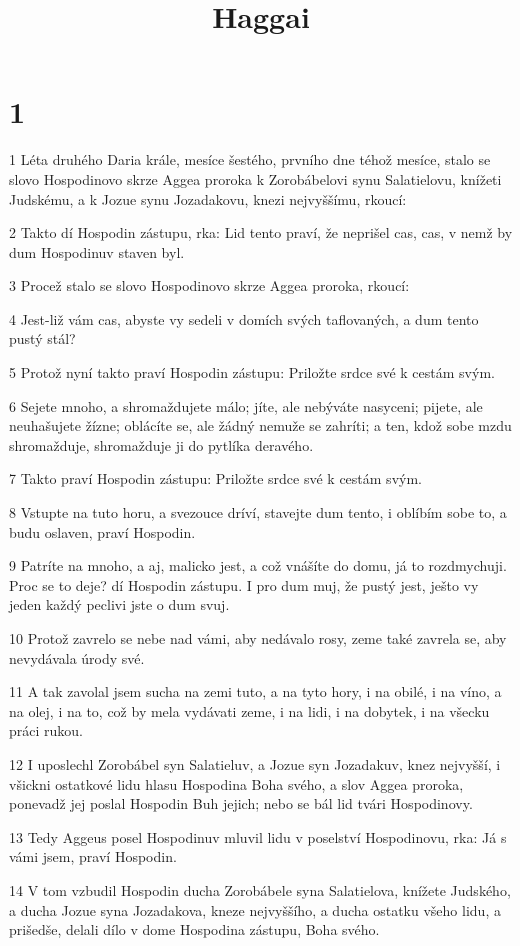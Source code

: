 

\title{Haggai}

\chapter{1}

\par 1 Léta druhého Daria krále, mesíce šestého, prvního dne téhož mesíce, stalo se slovo Hospodinovo skrze Aggea proroka k Zorobábelovi synu Salatielovu, knížeti Judskému, a k Jozue synu Jozadakovu, knezi nejvyššímu, rkoucí:
\par 2 Takto dí Hospodin zástupu, rka: Lid tento praví, že neprišel cas, cas, v nemž by dum Hospodinuv staven byl.
\par 3 Procež stalo se slovo Hospodinovo skrze Aggea proroka, rkoucí:
\par 4 Jest-liž vám cas, abyste vy sedeli v domích svých taflovaných, a dum tento pustý stál?
\par 5 Protož nyní takto praví Hospodin zástupu: Priložte srdce své k cestám svým.
\par 6 Sejete mnoho, a shromaždujete málo; jíte, ale nebýváte nasyceni; pijete, ale neuhašujete žízne; oblácíte se, ale žádný nemuže se zahríti; a ten, kdož sobe mzdu shromažduje, shromažduje ji do pytlíka deravého.
\par 7 Takto praví Hospodin zástupu: Priložte srdce své k cestám svým.
\par 8 Vstupte na tuto horu, a svezouce dríví, stavejte dum tento, i oblíbím sobe to, a budu oslaven, praví Hospodin.
\par 9 Patríte na mnoho, a aj, malicko jest, a což vnášíte do domu, já to rozdmychuji. Proc se to deje? dí Hospodin zástupu. I pro dum muj, že pustý jest, ješto vy jeden každý peclivi jste o dum svuj.
\par 10 Protož zavrelo se nebe nad vámi, aby nedávalo rosy, zeme také zavrela se, aby nevydávala úrody své.
\par 11 A tak zavolal jsem sucha na zemi tuto, a na tyto hory, i na obilé, i na víno, a na olej, i na to, což by mela vydávati zeme, i na lidi, i na dobytek, i na všecku práci rukou.
\par 12 I uposlechl Zorobábel syn Salatieluv, a Jozue syn Jozadakuv, knez nejvyšší, i všickni ostatkové lidu hlasu Hospodina Boha svého, a slov Aggea proroka, ponevadž jej poslal Hospodin Buh jejich; nebo se bál lid tvári Hospodinovy.
\par 13 Tedy Aggeus posel Hospodinuv mluvil lidu v poselství Hospodinovu, rka: Já s vámi jsem, praví Hospodin.
\par 14 V tom vzbudil Hospodin ducha Zorobábele syna Salatielova, knížete Judského, a ducha Jozue syna Jozadakova, kneze nejvyššího, a ducha ostatku všeho lidu, a prišedše, delali dílo v dome Hospodina zástupu, Boha svého.

